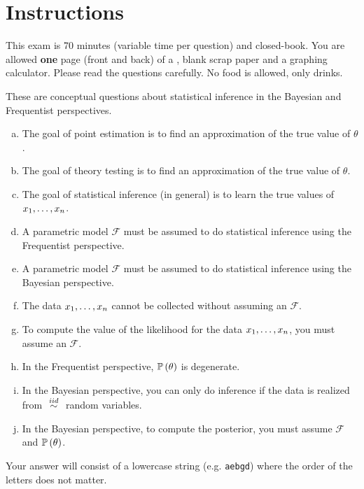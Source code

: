 \documentclass[12pt,landscape]{article}
\newcommand{\instr}{\small Your answer will consist of a lowercase string (e.g. \texttt{aebgd}) where the order of the letters does not matter. \normalsize}
\begin{document}
\section*{Instructions}
This exam is 70 minutes (variable time per question) and closed-book. You are allowed \textbf{one} page (front and back) of a , blank scrap paper and a graphing calculator. Please read the questions carefully. No food is allowed, only drinks. %

\pagebreak



\problem{} These are conceptual questions about statistical inference in the Bayesian and Frequentist perspectives.

\vspace{-0.2cm}\benum{} 

\begin{enumerate}[(a)]
\item The goal of point estimation is to find an approximation of the true value of $\theta$.
\item The goal of theory testing is to find an approximation of the true value of $\theta$.
\item The goal of statistical inference (in general) is to learn the true values of $x_1, \ldots, x_n$.
\item A parametric model $\mathcal{F}$ must be assumed to do statistical inference using the Frequentist perspective.
\item A parametric model $\mathcal{F}$ must be assumed to do statistical inference using the Bayesian perspective.
\item The data $x_1, \ldots, x_n$ cannot be collected without assuming an $\mathcal{F}$.
\item To compute the value of the likelihood for the data $x_1, \ldots, x_n$, you must assume an $\mathcal{F}$.
\item In the Frequentist perspective, $\mathbb{P}\left(\theta\right)$ is degenerate.
\item In the Bayesian perspective, you can only do inference if the data is realized from $\iid$ random variables.
\item In the Bayesian perspective, to compute the posterior, you must assume $\mathcal{F}$ and $\mathbb{P}\left(\theta\right)$.
\end{enumerate}
\eenum\instr\pagebreak
\end{document}
